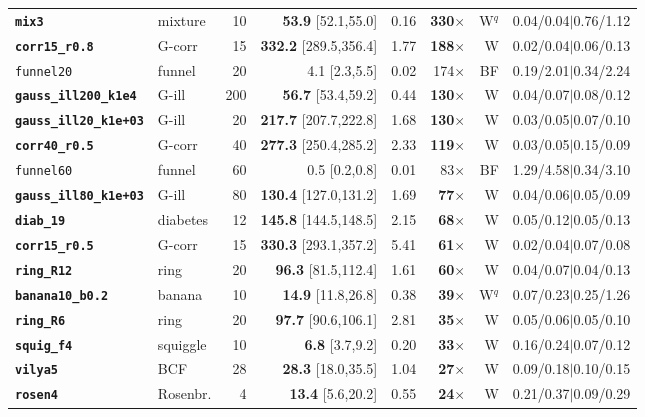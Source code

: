 {\begin{longtable}{llrrrrrl}
\textbf{\texttt{mix3}} & mixture & 10 & \textbf{53.9} [52.1,55.0] & 0.16 & \textbf{330$\times$} & W$^q$ & 0.04/0.04$\mid$0.76/1.12\\
\textbf{\texttt{corr15\_r0.8}} & G-corr & 15 & \textbf{332.2} [289.5,356.4] & 1.77 & \textbf{188$\times$} & W & 0.02/0.04$\mid$0.06/0.13\\
\texttt{funnel20} & funnel & 20 & 4.1 [2.3,5.5] & 0.02 & 174$\times$ & BF & 0.19/2.01$\mid$0.34/2.24\\
\textbf{\texttt{gauss\_ill200\_k1e4}} & G-ill & 200 & \textbf{56.7} [53.4,59.2] & 0.44 & \textbf{130$\times$} & W & 0.04/0.07$\mid$0.08/0.12\\
\textbf{\texttt{gauss\_ill20\_k1e+03}} & G-ill & 20 & \textbf{217.7} [207.7,222.8] & 1.68 & \textbf{130$\times$} & W & 0.03/0.05$\mid$0.07/0.10\\
\textbf{\texttt{corr40\_r0.5}} & G-corr & 40 & \textbf{277.3} [250.4,285.2] & 2.33 & \textbf{119$\times$} & W & 0.03/0.05$\mid$0.15/0.09\\
\texttt{funnel60} & funnel & 60 & 0.5 [0.2,0.8] & 0.01 & 83$\times$ & BF & 1.29/4.58$\mid$0.34/3.10\\
\textbf{\texttt{gauss\_ill80\_k1e+03}} & G-ill & 80 & \textbf{130.4} [127.0,131.2] & 1.69 & \textbf{77$\times$} & W & 0.04/0.06$\mid$0.05/0.09\\
\textbf{\texttt{diab\_19}} & diabetes & 12 & \textbf{145.8} [144.5,148.5] & 2.15 & \textbf{68$\times$} & W & 0.05/0.12$\mid$0.05/0.13\\
\textbf{\texttt{corr15\_r0.5}} & G-corr & 15 & \textbf{330.3} [293.1,357.2] & 5.41 & \textbf{61$\times$} & W & 0.02/0.04$\mid$0.07/0.08\\
\textbf{\texttt{ring\_R12}} & ring & 20 & \textbf{96.3} [81.5,112.4] & 1.61 & \textbf{60$\times$} & W & 0.04/0.07$\mid$0.04/0.13\\
\textbf{\texttt{banana10\_b0.2}} & banana & 10 & \textbf{14.9} [11.8,26.8] & 0.38 & \textbf{39$\times$} & W$^q$ & 0.07/0.23$\mid$0.25/1.26\\
\textbf{\texttt{ring\_R6}} & ring & 20 & \textbf{97.7} [90.6,106.1] & 2.81 & \textbf{35$\times$} & W & 0.05/0.06$\mid$0.05/0.10\\
\textbf{\texttt{squig\_f4}} & squiggle & 10 & \textbf{6.8} [3.7,9.2] & 0.20 & \textbf{33$\times$} & W & 0.16/0.24$\mid$0.07/0.12\\
\textbf{\texttt{vilya5}} & BCF & 28 & \textbf{28.3} [18.0,35.5] & 1.04 & \textbf{27$\times$} & W & 0.09/0.18$\mid$0.10/0.15\\
\textbf{\texttt{rosen4}} & Rosenbr. & 4 & \textbf{13.4} [5.6,20.2] & 0.55 & \textbf{24$\times$} & W & 0.21/0.37$\mid$0.09/0.29\\

\end{longtable}}
